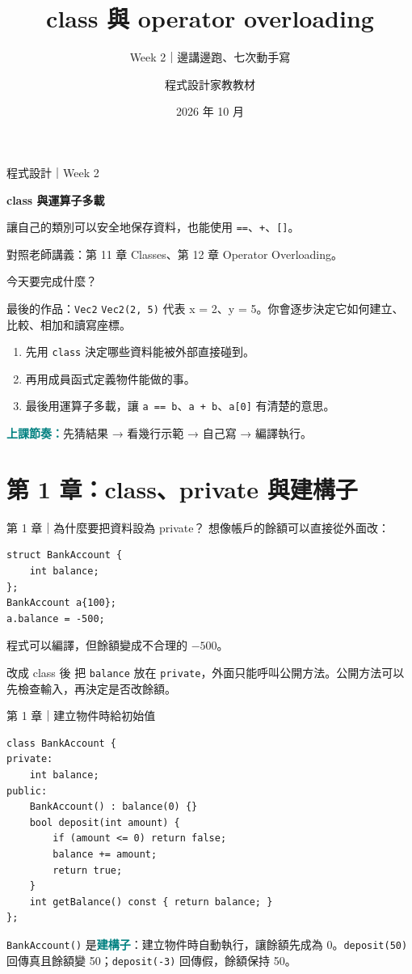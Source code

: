 \documentclass[aspectratio=169,11pt]{beamer}
\title{class 與 operator overloading}
\subtitle{Week 2｜邊講邊跑、七次動手寫}
\author{程式設計家教教材}
\date{2026 年 10 月}
\newcommand{\key}[1]{\textcolor{teal}{\textbf{#1}}}
\begin{document}
\begin{frame}[plain]
  \vspace*{1.3cm}
  {\Large\color{teal} 程式設計｜Week 2}\par\vspace{0.35cm}
  {\Huge\bfseries class 與運算子多載}\par\vspace{0.55cm}
  {\Large 讓自己的類別可以安全地保存資料，也能使用 \texttt{==}、\texttt{+}、\texttt{[]}。}\par
  \vfill
  {\small\color{muted} 對照老師講義：第 11 章 Classes、第 12 章 Operator Overloading。}
\end{frame}

\begin{frame}{今天要完成什麼？}
  \begin{block}{最後的作品：\texttt{Vec2}}
    \texttt{Vec2(2, 5)} 代表 x = 2、y = 5。你會逐步決定它如何建立、比較、相加和讀寫座標。
  \end{block}
  \begin{enumerate}
    \item 先用 \texttt{class} 決定哪些資料能被外部直接碰到。
    \item 再用成員函式定義物件能做的事。
    \item 最後用運算子多載，讓 \texttt{a == b}、\texttt{a + b}、\texttt{a[0]} 有清楚的意思。
  \end{enumerate}
  \vspace{0.4em}
  \key{上課節奏：}先猜結果 → 看幾行示範 → 自己寫 → 編譯執行。
\end{frame}

\section{第 1 章：class、private 與建構子}
\begin{frame}[fragile]{第 1 章｜為什麼要把資料設為 private？}
  想像帳戶的餘額可以直接從外面改：
\begin{lstlisting}
struct BankAccount {
    int balance;
};
BankAccount a{100};
a.balance = -500;
\end{lstlisting}
  程式可以編譯，但餘額變成不合理的 $-500$。
  \begin{block}{改成 class 後}
    把 \texttt{balance} 放在 \texttt{private}，外面只能呼叫公開方法。公開方法可以先檢查輸入，再決定是否改餘額。
  \end{block}
\end{frame}

\begin{frame}[fragile]{第 1 章｜建立物件時給初始值}
\begin{lstlisting}
class BankAccount {
private:
    int balance;
public:
    BankAccount() : balance(0) {}
    bool deposit(int amount) {
        if (amount <= 0) return false;
        balance += amount;
        return true;
    }
    int getBalance() const { return balance; }
};
\end{lstlisting}
  \texttt{BankAccount()} 是\key{建構子}：建立物件時自動執行，讓餘額先成為 0。\texttt{deposit(50)} 回傳真且餘額變 50；\texttt{deposit(-3)} 回傳假，餘額保持 50。
\end{frame}
\end{document}
